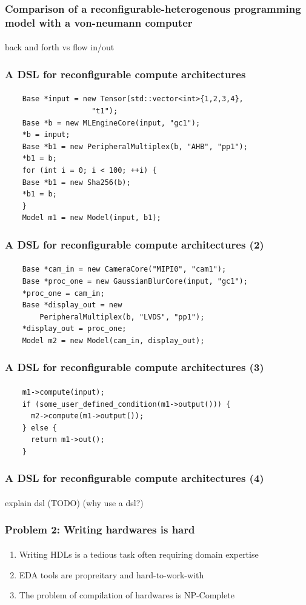 \documentclass{beamer}
\begin{document}
\begin{frame}[fragile]
  \frametitle{Comparison of a reconfigurable-heterogenous programming model with a von-neumann
  computer}
\framesubtitle{}
  back and forth vs flow in/out
\end{frame}

\begin{frame}[fragile]
  \frametitle{A DSL for reconfigurable compute architectures}
\framesubtitle{}
  \begin{verbatim}
    Base *input = new Tensor(std::vector<int>{1,2,3,4}, 
                    "t1");
    Base *b = new MLEngineCore(input, "gc1");
    *b = input;
    Base *b1 = new PeripheralMultiplex(b, "AHB", "pp1");
    *b1 = b;
    for (int i = 0; i < 100; ++i) {
    Base *b1 = new Sha256(b);
    *b1 = b;
    }
    Model m1 = new Model(input, b1);
  \end{verbatim}
\end{frame}

\begin{frame}[fragile]
  \frametitle{A DSL for reconfigurable compute architectures (2)}
\framesubtitle{}
  \begin{verbatim}
    Base *cam_in = new CameraCore("MIPI0", "cam1");
    Base *proc_one = new GaussianBlurCore(input, "gc1");
    *proc_one = cam_in;
    Base *display_out = new 
        PeripheralMultiplex(b, "LVDS", "pp1");
    *display_out = proc_one;
    Model m2 = new Model(cam_in, display_out);
  \end{verbatim}
\end{frame}

\begin{frame}[fragile]
  \frametitle{A DSL for reconfigurable compute architectures (3)}
\framesubtitle{}
  \begin{verbatim}
    m1->compute(input);
    if (some_user_defined_condition(m1->output())) {
      m2->compute(m1->output());
    } else {
      return m1->out();
    }
\end{verbatim}
\end{frame}

\begin{frame}[fragile]
  \frametitle{A DSL for reconfigurable compute architectures (4)}
\framesubtitle{}
  explain dsl (TODO) (why use a dsl?)
\end{frame}



\begin{frame}[fragile]
  \frametitle{Problem 2: Writing hardwares is hard}
  \framesubtitle{}
  \begin{enumerate}
    \item Writing HDLs is a tedious task often requiring domain expertise
    \item EDA tools are propreitary and hard-to-work-with
    \item The problem of compilation of hardwares is NP-Complete
  \end{enumerate}
\end{frame}
\end{document}
